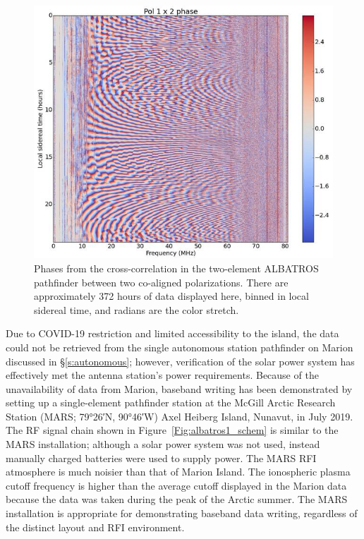 \begin{figure}
	\centering
	\includegraphics[width=0.7\linewidth]{Figures/pol1}
	\caption{Phases from the cross-correlation in the two-element ALBATROS pathfinder between two co-aligned polarizations. There are approximately 372 hours of data displayed here, binned in local sidereal time, and radians are the color stretch.}
	\label{Fig:pol1}
\end{figure}

Due to COVID-19 restriction and limited accessibility to the island, the data could not be retrieved from the single autonomous station pathfinder on Marion discussed in \S\ref{s:autonomous}; however, verification of the solar power system has effectively met the antenna station's power requirements. Because of the unavailability of data from Marion, baseband writing has been demonstrated by setting up a single-element pathfinder station at the McGill Arctic Research Station (MARS; \ang{79;26;}N, \ang{90;46;}W) Axel Heiberg Island, Nunavut, in July 2019. The RF signal chain shown in Figure~\ref{Fig:albatros1_schem} is similar to the MARS installation; although a solar power system was not used, instead manually charged batteries were used to supply power. The MARS RFI atmosphere is much noisier than that of Marion Island. The ionospheric plasma cutoff frequency is higher than the average cutoff displayed in the Marion data because the data was taken during the peak of the Arctic summer. The MARS installation is appropriate for demonstrating baseband data writing, regardless of the distinct layout and RFI environment. 

